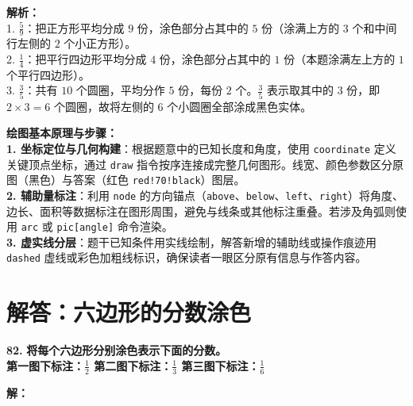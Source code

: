 \vspace{0.6cm}
{\small\color{gray}
\textbf{解析：}\\
1. $\frac{5}{9}$：把正方形平均分成 $9$ 份，涂色部分占其中的 $5$ 份（涂满上方的 $3$ 个和中间行左侧的 $2$ 个小正方形）。\\
2. $\frac{1}{4}$：把平行四边形平均分成 $4$ 份，涂色部分占其中的 $1$ 份（本题涂满左上方的 $1$ 个平行四边形）。\\
3. $\frac{3}{5}$：共有 $10$ 个圆圈，平均分作 $5$ 份，每份 $2$ 个。$\frac{3}{5}$ 表示取其中的 $3$ 份，即 $2 \times 3 = 6$ 个圆圈，故将左侧的 $6$ 个小圆圈全部涂成黑色实体。
}

\vspace{0.8cm}


\vspace{0.6cm}

{\small\color{blue!70!black}
\textbf{绘图基本原理与步骤：}\\
\textbf{1. 坐标定位与几何构建}：根据题意中的已知长度和角度，使用 \texttt{coordinate} 定义关键顶点坐标，通过 \texttt{draw} 指令按序连接成完整几何图形。线宽、颜色参数区分原图（黑色）与答案（红色 \texttt{red!70!black}）图层。\\
\textbf{2. 辅助量标注}：利用 \texttt{node} 的方向锚点（\texttt{above}、\texttt{below}、\texttt{left}、\texttt{right}）将角度、边长、面积等数据标注在图形周围，避免与线条或其他标注重叠。若涉及角弧则使用 \texttt{arc} 或 \texttt{pic[angle]} 命令渲染。\\
\textbf{3. 虚实线分层}：题干已知条件用实线绘制，解答新增的辅助线或操作痕迹用 \texttt{dashed} 虚线或彩色加粗线标识，确保读者一眼区分原有信息与作答内容。
}

\newpage



\section{解答：六边形的分数涂色}

\vspace{0.6cm}

\textbf{\LARGE 82.} \textbf{将每个六边形分别涂色表示下面的分数。\\[1ex]
第一图下标注：$\displaystyle\frac{1}{2}$ \qquad 第二图下标注：$\displaystyle\frac{1}{3}$ \qquad 第三图下标注：$\displaystyle\frac{1}{6}$}

\vspace{0.4cm}
\textbf{解：}

